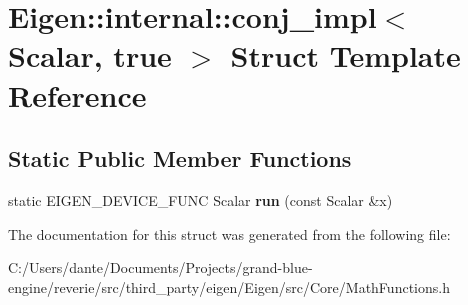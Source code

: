 \hypertarget{struct_eigen_1_1internal_1_1conj__impl_3_01_scalar_00_01true_01_4}{}\section{Eigen\+::internal\+::conj\+\_\+impl$<$ Scalar, true $>$ Struct Template Reference}
\label{struct_eigen_1_1internal_1_1conj__impl_3_01_scalar_00_01true_01_4}
\subsection*{Static Public Member Functions}
\begin{DoxyCompactItemize}
\item 
\mbox{\label{struct_eigen_1_1internal_1_1conj__impl_3_01_scalar_00_01true_01_4_a0644a2f594f6ad99f16c1f0365939fd7}} 
static E\+I\+G\+E\+N\+\_\+\+D\+E\+V\+I\+C\+E\+\_\+\+F\+U\+NC Scalar {\bfseries run} (const Scalar \&x)
\end{DoxyCompactItemize}


The documentation for this struct was generated from the following file\+:\begin{DoxyCompactItemize}
\item 
C\+:/\+Users/dante/\+Documents/\+Projects/grand-\/blue-\/engine/reverie/src/third\+\_\+party/eigen/\+Eigen/src/\+Core/Math\+Functions.\+h\end{DoxyCompactItemize}
